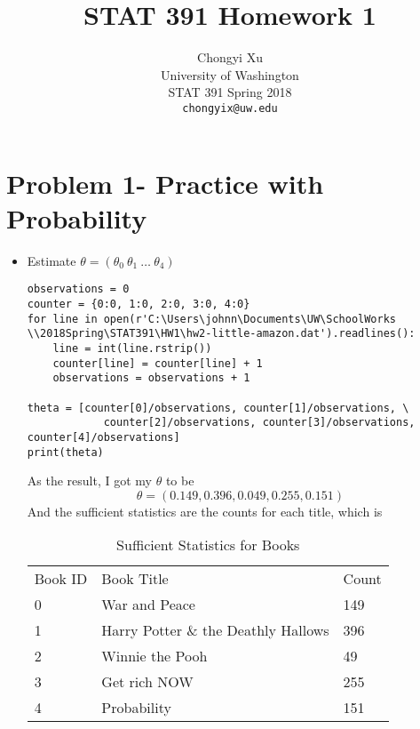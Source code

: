 \documentclass[preprint,12pt]{elsarticle}
\begin{document}
    \title{\LARGE \bf
        STAT 391 Homework 1
        }
        
        \author{ \parbox{3 in}{\centering Chongyi Xu \\
                 University of Washington\\
                 STAT 391 Spring 2018\\
                 {\tt\small chongyix@uw.edu}}
        }
    \maketitle

    \section{Problem 1- Practice with Probability}
    \begin{itemize}
        \item Estimate $\theta = (\theta_0\ \theta_1\ \dots\ \theta_4)$
        \begin{lstlisting}
observations = 0
counter = {0:0, 1:0, 2:0, 3:0, 4:0}
for line in open(r'C:\Users\johnn\Documents\UW\SchoolWorks
\\2018Spring\STAT391\HW1\hw2-little-amazon.dat').readlines():
    line = int(line.rstrip())
    counter[line] = counter[line] + 1
    observations = observations + 1

theta = [counter[0]/observations, counter[1]/observations, \
            counter[2]/observations, counter[3]/observations, counter[4]/observations]
print(theta)
        \end{lstlisting}
        As the result, I got my $\theta$ to be
        \begin{equation*}
            \theta = (0.149, 0.396, 0.049, 0.255, 0.151)
        \end{equation*}
        And the sufficient statistics are the counts for each title, which is
        \begin{table}[]
            \centering
            \caption{Sufficient Statistics for Books}
            \label{my-label}
            \begin{tabular}{lll}
            Book ID & Book Title                          & Count \\
            0       & War and Peace                       & 149   \\
            1       & Harry Potter \& the Deathly Hallows & 396   \\
            2       & Winnie the Pooh                     & 49    \\
            3       & Get rich NOW                        & 255   \\
            4       & Probability                         & 151  
            \end{tabular}
        \end{table}


\end{itemize}
\end{document}
